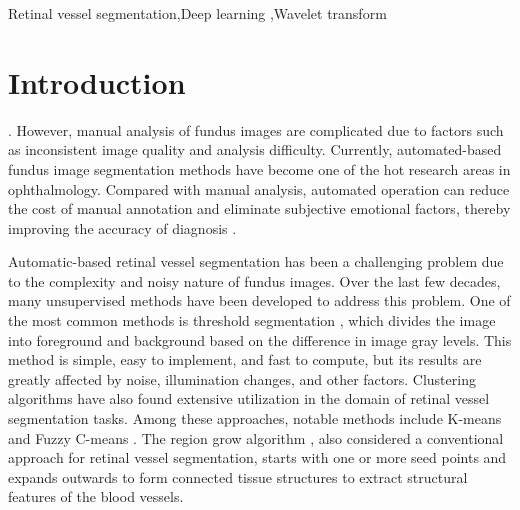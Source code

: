 \documentclass[a4paper,fleqn]{cas-dc}
\begin{document}
\begin{keywords}
Retinal vessel segmentation\sep Deep learning \sep Wavelet transform 
\end{keywords}

\maketitle

\section{Introduction}\label{intro}
 \cite{Vujosevic2020ScreeningFD}. However, manual analysis of fundus images are complicated due to factors such as inconsistent image quality and analysis difficulty. Currently, automated-based fundus image segmentation methods have become one of the hot research areas in ophthalmology. Compared with manual analysis, automated operation can reduce the cost of manual annotation and eliminate subjective emotional factors, thereby improving the accuracy of diagnosis \cite{Oh2021EarlyDO}.

Automatic-based retinal vessel segmentation has been a challenging problem due to the complexity and noisy nature of fundus images. Over the last few decades, many unsupervised methods have been developed to address this problem. One of the most common methods is threshold segmentation \cite{7467731, PrasadReddy2021BloodVE, Wiharto2019BloodVS,Halder2016QualitativeCO}, which divides the image into foreground and background based on the difference in image gray levels. This method is simple, easy to implement, and fast to compute, but its results are greatly affected by noise, illumination changes, and other factors. Clustering algorithms have also found extensive utilization in the domain of retinal vessel segmentation tasks. Among these approaches, notable methods include K-means \cite{Hartigan1979AKC} and Fuzzy C-means \cite{Bezdek1984FCMTF}. The region grow algorithm \cite{Rahayu2022AutomaticPS,Rodrigues2020ELEMENTMR}, also considered a conventional approach for retinal vessel segmentation, starts with one or more seed points and expands outwards to form connected tissue structures to extract structural features of the blood vessels.
\end{document}
